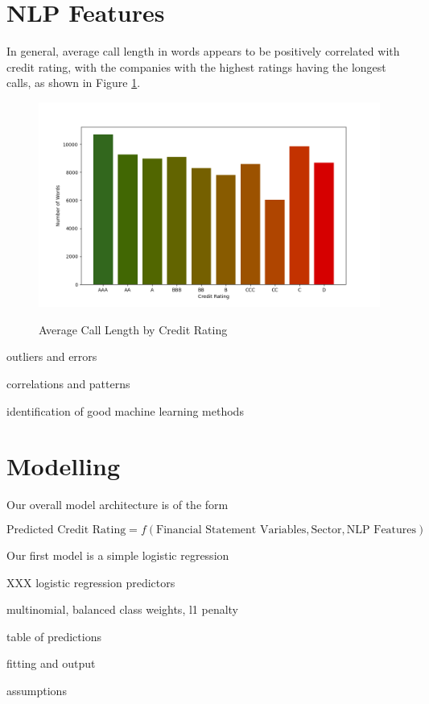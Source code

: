 \documentclass{article}[11pt]
\begin{document}
    \section*{NLP Features}

    In general, average call length in words appears to be positively correlated with credit rating, with the companies with the highest ratings having the longest calls, as shown in Figure \ref{fig:call-length-by-credit-rating}.
    
    \begin{figure}[h!]
		\centering
        \caption{Average Call Length by Credit Rating}
        \includegraphics[width=0.5\linewidth,keepaspectratio=true]{../Output/All Data EDA/NLP EDA/all_data_call_length_by_credit_rating_no_title.png}
        \label{fig:call-length-by-credit-rating}
	\end{figure}

    outliers and errors

    correlations and patterns

    identification of good machine learning methods

    \section*{Modelling}

    Our overall model architecture is of the form

    \begin{equation*}
        \text{Predicted Credit Rating} = f(\text{Financial Statement Variables}, \text{Sector}, \text{NLP Features})
    \end{equation*}

    Our first model is a simple logistic regression

    XXX logistic regression predictors

    multinomial, balanced class weights, l1 penalty

    table of predictions

    fitting and output

    assumptions
    
\end{document}

